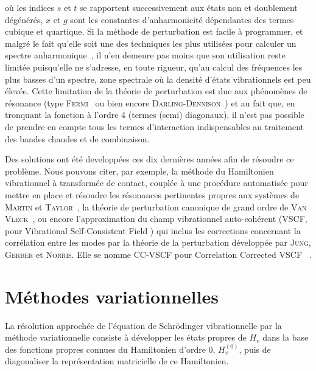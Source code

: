 \documentclass[12pt,a4paper]{book}
\begin{document}
\noindent où les indices $s$ et $t$ se rapportent successivement aux états non et doublement dégénérés, $x$ et $g$ sont les constantes d'anharmonicité dépendantes des termes cubique et quartique. Si la méthode de perturbation est facile à programmer, et malgré le fait qu'elle soit une des techniques les plus utilisées pour calculer un spectre anharmonique~\cite{frisch2015gaussian}, il n'en demeure pas moins que son utilisation reste limitée puisqu'elle ne s'adresse, en toute rigueur, qu'au calcul des fréquences les plus basses d'un spectre, zone spectrale où la densité d'états vibrationnels est peu élevée. Cette limitation de la théorie de perturbation est due aux phénomènes de résonance (type \textsc{Fermi}~\cite{fermi1931ramaneffekt} ou bien encore \textsc{Darling-Dennison}~\cite{darling1940water}) et au fait que, en tronquant la fonction à l'ordre 4 (termes (semi) diagonaux), il n'est pas possible de prendre en compte tous les termes d'interaction indispensables au traitement des bandes chaudes et de combinaison.

Des solutions ont été developpées ces dix dernières années afin de résoudre ce problème. Nous pouvons citer, par exemple, la méthode du Hamiltonien vibrationnel à transformée de contact, couplée à une procédure automatisée pour mettre en place et résoudre les résonances pertinentes propres aux systèmes de \textsc{Martin} et \textsc{Taylor}~\cite{martin1997accurate}, la théorie de perturbation canonique de grand ordre de \textsc{Van Vleck}~\cite{nielsen1951vibration}, ou encore l'approximation du champ vibrationnel auto-cohérent (VSCF, pour \og Vibrational Self-Consistent Field \fg{}) qui inclus les corrections concernant la corrélation entre les modes par la théorie de la perturbation développée par \textsc{Jung}, \textsc{Gerber} et \textsc{Norris}. Elle se nomme CC-VSCF pour \og Correlation Corrected VSCF \fg ~\cite{jung1996vibrational,norris1996mo}. 


\section{Méthodes variationnelles}\label{methodesvariationnelles}

La résolution approchée de l'équation de Schr\"{o}dinger vibrationnelle par la méthode variationnelle consiste à développer les états propres de $H_v$ dans la base des fonctions propres connues du Hamiltonien d'ordre 0, $H^{(0)}_v$, puis de diagonaliser la représentation matricielle de ce Hamiltonien. 
\end{document}
